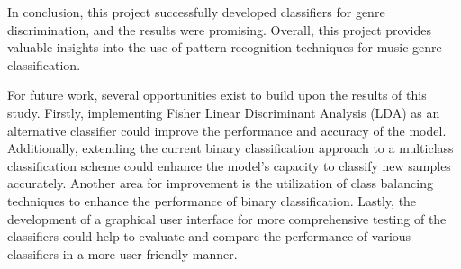 \documentclass[12pt, a4paper]{article}
\begin{document}
In conclusion, this project successfully developed classifiers for genre discrimination, and the results were promising. Overall, this project provides valuable insights into the use of pattern recognition techniques for music genre classification.

For future  work, several opportunities exist to build upon the results of this study. Firstly, implementing Fisher Linear Discriminant Analysis (LDA) as an alternative classifier could improve the performance and accuracy of the model. Additionally, extending the current binary classification approach to a multiclass classification scheme could enhance the model's capacity to classify new samples accurately. Another area for improvement is the utilization of class balancing techniques to enhance the performance of binary classification. Lastly, the development of a graphical user interface for more comprehensive testing of the classifiers could help to evaluate and compare the performance of various classifiers in a more user-friendly manner.




\newpage
{}

%

\end{document}
